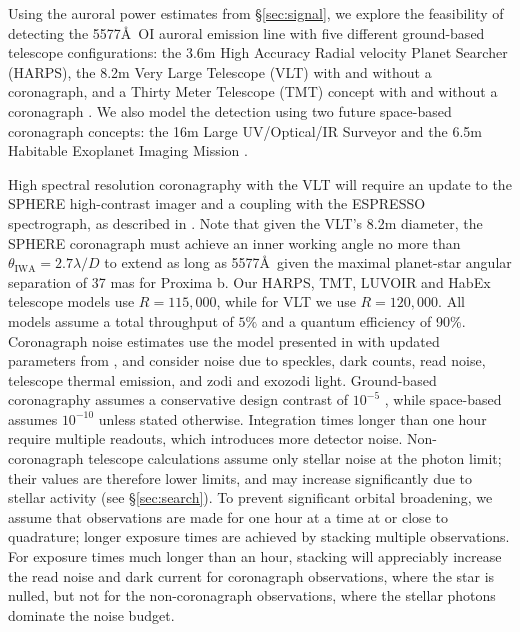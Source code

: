 \documentclass{emulateapj}
\begin{document}
Using the auroral power estimates from \S\ref{sec:signal}, we explore the feasibility of detecting the 5577\AA\ OI auroral emission line with five different ground-based telescope configurations: the 3.6m High Accuracy Radial velocity Planet Searcher (HARPS), the 8.2m Very Large Telescope (VLT) with and without a coronagraph, and a Thirty Meter Telescope (TMT) concept with and without a coronagraph \citep{Skidmore2015,Udry2014,Johns2012}. We also model the detection using two future space-based coronagraph concepts: the 16m Large UV/Optical/IR Surveyor \citep[LUVOIR;][]{Kouveliotou2014,Dalcanton2015} and the 6.5m Habitable Exoplanet Imaging Mission \citep[HabEx;][]{Mennesson2016}.

High spectral resolution coronagraphy with the VLT will require an update to the SPHERE high-contrast imager and a coupling with the ESPRESSO spectrograph, as described in \citet{Lovis2016}. Note that given the VLT's 8.2m diameter, the SPHERE coronagraph must achieve an inner working angle no more than $\theta_{\text{IWA}} = 2.7 \lambda / D$ to extend as long as 5577\AA\, given the maximal planet-star angular separation of 37 mas for Proxima b. Our HARPS, TMT, LUVOIR and HabEx telescope models use $R = 115,000$, while for VLT we use $R = 120,000$. All models assume a total throughput of $5\%$ and a quantum efficiency of 90\%. Coronagraph noise estimates use the model presented in \citet{Robinson2016} with updated parameters from \citet{Meadows2016}, and consider noise due to speckles, dark counts, read noise, telescope thermal emission, and zodi and exozodi light. Ground-based coronagraphy assumes a conservative design contrast of $10^{-5}$ \citep{Dou2010,Guyon2012}, while space-based assumes $10^{-10}$ \citep{Meadows2016} unless stated otherwise. Integration times longer than one hour require multiple readouts, which introduces more detector noise. Non-coronagraph telescope calculations assume only stellar noise at the photon limit; their values are therefore lower limits, and may increase significantly due to stellar activity (see \S\ref{sec:search}). To prevent significant orbital broadening, we assume that observations are made for one hour at a time at or close to quadrature; longer exposure times are achieved by stacking multiple observations. For exposure times much longer than an hour, stacking will appreciably increase the read noise and dark current for coronagraph observations, where the star is nulled, but not for the non-coronagraph observations, where the stellar photons dominate the noise budget.
\end{document}
